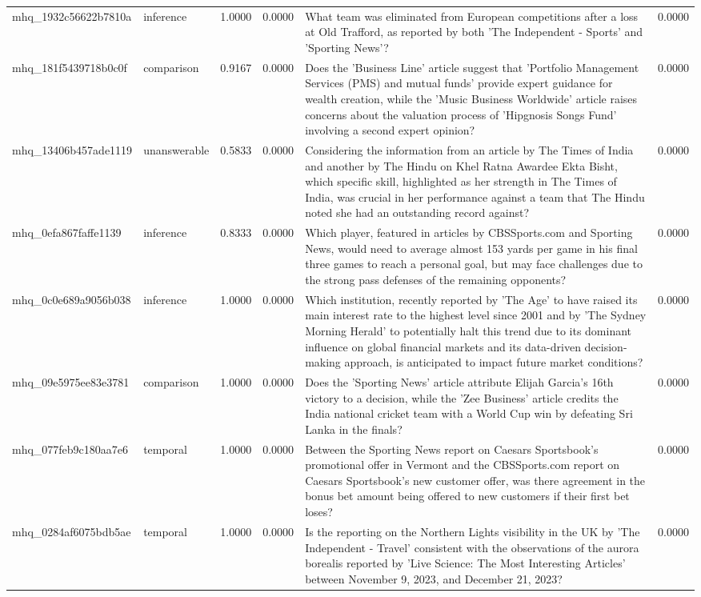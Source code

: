 \begin{tabular}{llrrlr}
mhq_1932c56622b7810a & inference & 1.0000 & 0.0000 & What team was eliminated from European competitions after a loss at Old Trafford, as reported by both 'The Independent - Sports' and 'Sporting News'? & 0.0000 \\
mhq_181f5439718b0c0f & comparison & 0.9167 & 0.0000 & Does the 'Business Line' article suggest that 'Portfolio Management Services (PMS) and mutual funds' provide expert guidance for wealth creation, while the 'Music Business Worldwide' article raises concerns about the valuation process of 'Hipgnosis Songs Fund' involving a second expert opinion? & 0.0000 \\
mhq_13406b457ade1119 & unanswerable & 0.5833 & 0.0000 & Considering the information from an article by The Times of India and another by The Hindu on Khel Ratna Awardee Ekta Bisht, which specific skill, highlighted as her strength in The Times of India, was crucial in her performance against a team that The Hindu noted she had an outstanding record against? & 0.0000 \\
mhq_0efa867faffe1139 & inference & 0.8333 & 0.0000 & Which player, featured in articles by CBSSports.com and Sporting News, would need to average almost 153 yards per game in his final three games to reach a personal goal, but may face challenges due to the strong pass defenses of the remaining opponents? & 0.0000 \\
mhq_0c0e689a9056b038 & inference & 1.0000 & 0.0000 & Which institution, recently reported by 'The Age' to have raised its main interest rate to the highest level since 2001 and by 'The Sydney Morning Herald' to potentially halt this trend due to its dominant influence on global financial markets and its data-driven decision-making approach, is anticipated to impact future market conditions? & 0.0000 \\
mhq_09e5975ee83e3781 & comparison & 1.0000 & 0.0000 & Does the 'Sporting News' article attribute Elijah Garcia's 16th victory to a decision, while the 'Zee Business' article credits the India national cricket team with a World Cup win by defeating Sri Lanka in the finals? & 0.0000 \\
mhq_077feb9c180aa7e6 & temporal & 1.0000 & 0.0000 & Between the Sporting News report on Caesars Sportsbook's promotional offer in Vermont and the CBSSports.com report on Caesars Sportsbook's new customer offer, was there agreement in the bonus bet amount being offered to new customers if their first bet loses? & 0.0000 \\
mhq_0284af6075bdb5ae & temporal & 1.0000 & 0.0000 & Is the reporting on the Northern Lights visibility in the UK by 'The Independent - Travel' consistent with the observations of the aurora borealis reported by 'Live Science: The Most Interesting Articles' between November 9, 2023, and December 21, 2023? & 0.0000 \\

\end{tabular}

